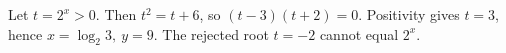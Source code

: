 Let $t=2^x>0$. Then $t^2=t+6$, so $(t-3)(t+2)=0$. Positivity gives $t=3$, hence $\boxed{x=\log_2 3,\ y=9}$. The rejected root $t=-2$ cannot equal $2^x$.
